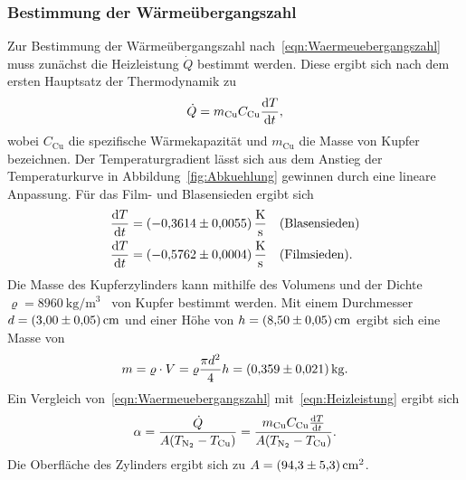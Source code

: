 \documentclass[parskip=half, a4paper,twoside,final]{article}
\begin{document}
\subsubsection{Bestimmung der Wärmeübergangszahl}

Zur Bestimmung der Wärmeübergangszahl nach~\eqref{eqn:Waermeuebergangszahl} muss zunächst die Heizleistung $\dot{Q}$ bestimmt werden. Diese ergibt sich nach dem ersten Hauptsatz der Thermodynamik zu
\begin{align}\label{eqn:Heizleistung}
  \dot{Q} = m_\text{Cu} C_\text{Cu} \dv{T}{t},
\end{align}
wobei $C_\text{Cu}$ die spezifische Wärmekapazität und $m_\text{Cu}$ die Masse von Kupfer bezeichnen. Der Temperaturgradient lässt sich aus dem Anstieg der Temperaturkurve in Abbildung~\ref{fig:Abkuehlung} gewinnen durch eine lineare Anpassung. Für das Film- und Blasensieden ergibt sich
\begin{align}
  \dv{T}{t} &= \SI{-0.3614\pm 0.0055}{\kelvin\per\second} \quad (\text{Blasensieden})\\
  \dv{T}{t} &= \SI{-0.5762\pm 0.0004}{\kelvin\per\second} \quad (\text{Filmsieden}).
\end{align}
Die Masse des Kupferzylinders kann mithilfe des Volumens und der Dichte $\varrho = \SI[per-mode=symbol]{8960}{\kilo\gram\per\metre\cubed}$~\cite{Fastowski} von Kupfer bestimmt werden. Mit einem Durchmesser $d = \SI{3 \pm 0.05}{\centi\metre}$ und einer Höhe von $h=\SI{8.5\pm 0.05}{\centi\metre}$ ergibt sich eine Masse von
\begin{align}
  m = \varrho \cdot V = \varrho \frac{\pi d^2}{4}h = \SI{0.359\pm 0.021}{\kilo\gram}.
\end{align}
Ein Vergleich von~\eqref{eqn:Waermeuebergangszahl} mit~\eqref{eqn:Heizleistung} ergibt sich
\begin{align}\label{eqn:alpha}
  \alpha = \frac{\dot{Q}}{A (T_\text{\ce{N2}}-T_\text{Cu})} = \frac{m_\text{Cu} C_\text{Cu} \dv{T}{t}}{A (T_\text{\ce{N2}}-T_\text{Cu})}.
\end{align}
Die Oberfläche des Zylinders ergibt sich zu $A = \SI{94.3\pm5.3}{\centi\metre\squared}$.
\end{document}
